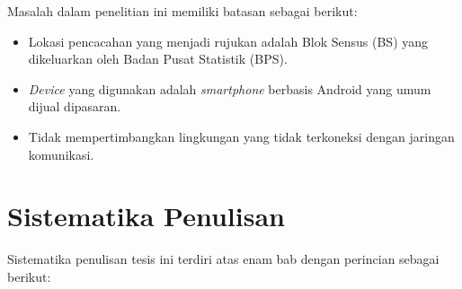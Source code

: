 Masalah dalam penelitian ini memiliki batasan sebagai berikut:

\begin{itemize}
\item Lokasi pencacahan yang menjadi rujukan adalah Blok Sensus (BS) yang dikeluarkan oleh Badan Pusat Statistik (BPS).
\item \textit{Device} yang digunakan adalah \textit{smartphone} berbasis Android yang umum dijual dipasaran.
\item Tidak mempertimbangkan lingkungan yang tidak terkoneksi dengan jaringan komunikasi.
\end{itemize}


% 


\section{Sistematika Penulisan}

Sistematika penulisan tesis ini terdiri atas enam bab dengan perincian sebagai berikut:
